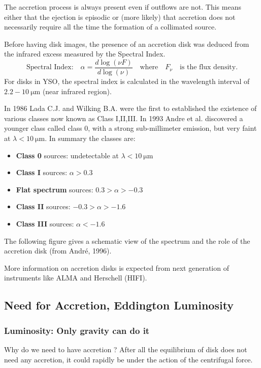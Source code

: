 \documentclass[10pt,a4paper,english,draft]{article}
\begin{document}
The accretion process is always present even if outflows are not. This means
either that the ejection is episodic or (more likely) that accretion does not
necessarily require all the time the formation of a collimated source.

Before having disk images, the presence of an accretion disk was deduced from
the infrared excess measured by the Spectral Index. \[\text{Spectral
Index:}\quad \alpha=\frac{d\log(\nu F)}{d \log(\nu)}\quad\text{where}\quad
F_{\nu}\quad\text{is the flux density.}\] For disks in YSO, the spectral index
is calculated in the wavelength interval of $2.2-\SI{10}{\um}$ (near infrared
region).

In 1986 Lada C.J. and Wilking B.A. were the first to established the existence
of various classes now known as Class I,II,III. In 1993 Andre et al. discovered
a younger class called class 0, with a strong sub-millimeter emission, but very
faint at $\lambda<\SI{10}{\um}$. In summary the classes are:
\begin{itemize}
    \item \textbf{Class 0} sources: undetectable at $\lambda<\SI{10}{\um}$
    \item \textbf{Class I} sources: $\alpha>0.3$
    \item \textbf{Flat spectrum} sources: $0.3>\alpha>-0.3$
    \item \textbf{Class II} sources: $-0.3>\alpha>-1.6$
    \item \textbf{Class III} sources: $\alpha<-1.6$
\end{itemize}

The following figure gives a schematic view of the spectrum and the role of the
accretion disk (from André, 1996).

More information on accretion disks is expected from next generation of
instruments like ALMA and Herschell (HIFI).

\subsection{Need for Accretion, Eddington Luminosity}

\subsubsection{Luminosity: Only gravity can do it}

Why do we need to have accretion ? After all the equilibrium of disk does not
need any accretion, it could rapidly be under the action of the centrifugal
force.
\end{document}
